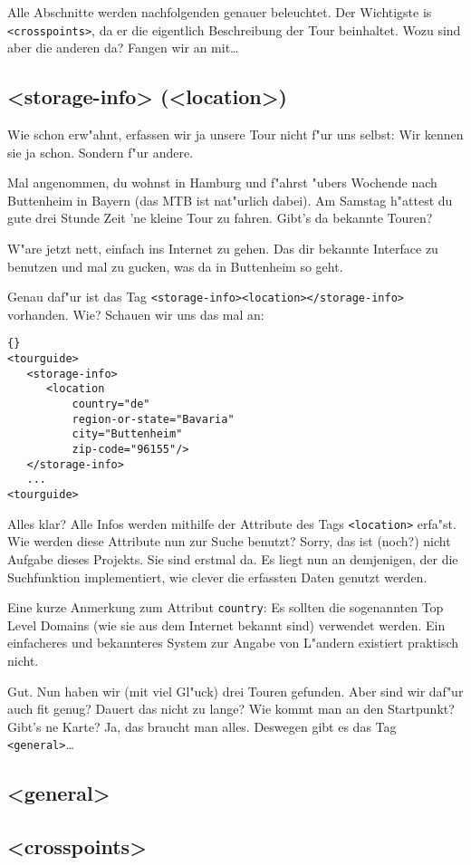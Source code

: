 Alle Abschnitte werden nachfolgenden genauer beleuchtet. Der
Wichtigste is \texttt{<crosspoints>}, da er die eigentlich
Beschreibung der Tour beinhaltet. Wozu sind aber die anderen
da? Fangen wir an mit\ldots

\subsection{<storage-info> (<location>)}
Wie schon erw"ahnt, erfassen wir ja unsere Tour nicht f"ur uns 
selbst: Wir kennen sie ja schon. Sondern f"ur andere.

Mal angenommen, du wohnst in Hamburg und f"ahrst "ubers Wochende
nach Buttenheim in Bayern (das MTB ist nat"urlich dabei). Am
Samstag h"attest du gute drei Stunde Zeit 'ne kleine Tour zu
fahren. Gibt's da bekannte Touren?

W"are jetzt nett, einfach ins Internet zu gehen. Das dir 
bekannte Interface zu benutzen und mal zu gucken, was da in
Buttenheim so geht.

Genau daf"ur ist das Tag \texttt{<storage-info><location></storage-info>}
vorhanden. Wie? Schauen wir uns das mal an:

\lstset{numbers=left,numberstyle=\tiny,stepnumber=1}
\begin{lstlisting}{}
<tourguide>
   <storage-info>
      <location 
          country="de" 
          region-or-state="Bavaria" 
          city="Buttenheim" 
          zip-code="96155"/>
   </storage-info>
   ...
<tourguide>
\end{lstlisting}

Alles klar? Alle Infos werden mithilfe der Attribute des Tags
\texttt{<location>} erfa"st. Wie werden diese Attribute nun 
zur Suche benutzt? Sorry, das ist (noch?) nicht Aufgabe dieses
Projekts. Sie sind erstmal da. Es liegt nun an demjenigen, der
die Suchfunktion implementiert, wie clever die erfassten Daten
genutzt werden.

Eine kurze Anmerkung zum Attribut \texttt{country}: Es sollten
die sogenannten Top Level Domains (wie sie aus dem Internet
bekannt sind) verwendet werden. Ein einfacheres und bekannteres 
System zur Angabe von L"andern existiert praktisch nicht.

Gut. Nun haben wir (mit viel Gl"uck) drei Touren gefunden.
Aber sind wir daf"ur auch fit genug? Dauert das nicht zu 
lange? Wie kommt man an den Startpunkt? Gibt's ne Karte?
Ja, das braucht man alles. Deswegen gibt es das Tag
\texttt{<general>}\ldots

\subsection{<general>}



\subsection{<crosspoints>}